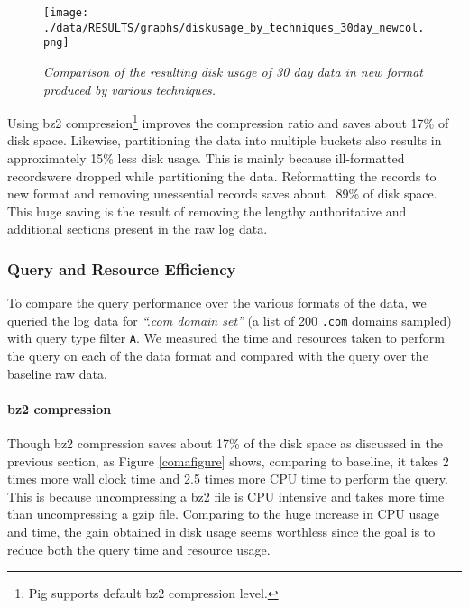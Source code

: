 \documentclass[11pt,a4paper]{article}
\begin{document}
\begin{figure}[H] 
\centering
\texttt{[image: ./data/RESULTS/graphs/diskusage\_by\_techniques\_30day\_newcol.png]}
\caption {\textit{Comparison of the resulting disk usage of 30 day data in new format produced by various techniques.}}
\end{figure}

Using bz2 compression\footnote{Pig supports default bz2 compression level.} improves the compression ratio and saves about 17\% of disk space. Likewise, partitioning the data into multiple buckets also results in approximately 15\% less disk usage. This is mainly because ill-formatted records\footnotemark were dropped while partitioning the data. Reformatting the records to new format and removing unessential records saves about ~89\% of disk space. This huge saving is the result of removing the lengthy authoritative and additional sections present in the raw log data.

\subsubsection{Query and Resource Efficiency}
To compare the query performance over the various formats of the data, we queried the log data for \textit{``.com domain set''} (a list of 200 \texttt{.com} domains sampled) with query type filter \texttt{A}. We measured the time and resources taken to perform the query on each of the data format and compared with the query over the baseline raw data.

\paragraph{bz2 compression}Though bz2 compression saves about 17\% of the disk space as discussed in the previous section, as Figure \ref{comafigure} shows, comparing to baseline, it takes 2 times more wall clock time and 2.5 times more CPU time to perform the query. This is because uncompressing a bz2 file is CPU intensive and takes more time than uncompressing a gzip file. Comparing to the huge increase in CPU usage and time, the gain obtained in disk usage seems worthless since the goal is to reduce both the query time and resource usage.
\end{document}
